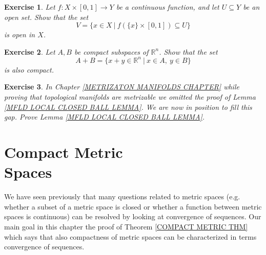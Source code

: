 \documentclass[11pt, letterpaper, oneside]{report}
\theoremstyle{pplain}
\newtheorem{ITERMVALUE THM}[theorem]{Intermediate Value Theorem}
\newtheorem{HEINEBOREL THM}[theorem]{Heine-Borel Theorem}
\newtheorem{UMETR THM}[theorem]{Urysohn Metrization Theorem}
\newtheorem{UMETR2 THM}[theorem]{Urysohn Metrization Theorem (v.2)}
\theoremstyle{ddefinition}
\theoremstyle{nnn}
\newtheorem{TDA NN}[theorem]{Topological Data Analysis. }
\theoremstyle{eexercise}
\newtheorem{exercise}{Exercise}[chapter]
\newcommand{\R}{{\mathbb R}}
\begin{document}
\begin{exercise}
Let $f\colon X\times [0, 1] \to Y$ be a continuous function, and let $U\subseteq Y$
be an open set. Show that the set 
$$V = \{x\in X \ | \ f(\{x\}\times [0, 1]) \subseteq U\}$$ is open in $X$.
\end{exercise}





\begin{exercise}
Let $A, B$ be compact subspaces of $\R^{n}$. Show that the set
$$A+B = \{ x+y\in \R^{n} \ | \ x\in A, \ y\in B \}$$
is also compact. 
\end{exercise}



%
%
%

\begin{exercise}
\label{MFLD LOCAL CLOSED BALL EXERCISE}
In Chapter \ref{METRIZATON MANIFOLDS CHAPTER} while proving that topological 
manifolds are metrizable we omitted the proof of Lemma 
\ref{MFLD LOCAL CLOSED BALL LEMMA}. We are now in position to fill this gap. 
Prove Lemma \ref{MFLD LOCAL CLOSED BALL LEMMA}. 
\end{exercise}





\newpage


\chapter[Compact Metric Spaces]{Compact Metric \\ Spaces}

\thispagestyle{firststyle}

We have seen previously that many questions related to metric spaces (e.g. whether a
subset of a metric space is closed or whether a function between metric spaces is continuous)
can be resolved by looking at convergence of sequences. 
Our main goal in this chapter 
the proof  of Theorem \ref{COMPACT METRIC THM} which says that also compactness 
of metric spaces can be characterized in terms convergence of sequences. 
\end{document}
